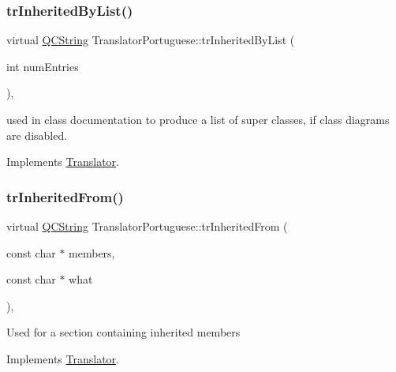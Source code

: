 \mbox{\label{class_translator_portuguese_ac930caa238de978d60de05dcb2050233}} 
\subsubsection{\texorpdfstring{trInheritedByList()}{trInheritedByList()}}
{\footnotesize\ttfamily virtual \mbox{\hyperlink{class_q_c_string}{Q\+C\+String}} Translator\+Portuguese\+::tr\+Inherited\+By\+List (\begin{DoxyParamCaption}\item[{int}]{num\+Entries }\end{DoxyParamCaption})\hspace{0.3cm}{\ttfamily [inline]}, {\ttfamily [virtual]}}

used in class documentation to produce a list of super classes, if class diagrams are disabled. 

Implements \mbox{\hyperlink{class_translator}{Translator}}.

\mbox{\label{class_translator_portuguese_a26e0e11a91d2812d7c4ee065bf336ade}} 
\subsubsection{\texorpdfstring{trInheritedFrom()}{trInheritedFrom()}}
{\footnotesize\ttfamily virtual \mbox{\hyperlink{class_q_c_string}{Q\+C\+String}} Translator\+Portuguese\+::tr\+Inherited\+From (\begin{DoxyParamCaption}\item[{const char $\ast$}]{members,  }\item[{const char $\ast$}]{what }\end{DoxyParamCaption})\hspace{0.3cm}{\ttfamily [inline]}, {\ttfamily [virtual]}}

Used for a section containing inherited members 

Implements \mbox{\hyperlink{class_translator}{Translator}}.

\mbox{\label{class_translator_portuguese_ab6bb422e47718ce45298b9cf1f5088ff}} 
